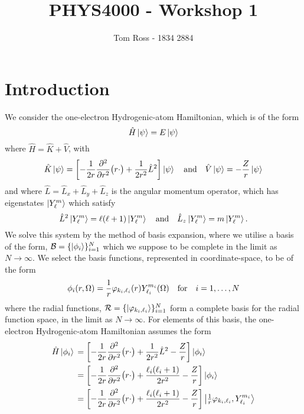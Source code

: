 \documentclass[]{article}
\title{PHYS4000 - Workshop 1}
\author{Tom Ross - 1834 2884}
\date{}
\begin{document}
\section{Introduction}
\label{sec:introduction}

We consider the one-electron Hydrogenic-atom Hamiltonian, which is of the form
\begin{equation*}
  \hat{H}
  \ket{\psi}
  =
  E
  \ket{\psi}
\end{equation*}
where $\hat{H} = \hat{K} + \hat{V}$, with
\begin{equation*}
  \hat{K}
  \ket{\psi}
  =
  \lrsq[\bigg]
  {
    -
    \dfrac{1}{2 r}
    \pdv[2]{r}
    \lr[\big]
    {
      r
      \cdot
    }
    +
    \dfrac{1}{2 r^{2}}
    \hat{L}^{2}
  }
  \ket{\psi}
  \qq{and}
  \hat{V}
  \ket{\psi}
  =
  -
  \dfrac{Z}{r}
  \ket{\psi}
\end{equation*}
and where $\hat{L} = \hat{L}_{x} + \hat{L}_{y} + \hat{L}_{z}$ is the angular
momentum operator, which has eigenstates $\ket{Y_{\ell}^{m}}$ which satisfy
\begin{equation*}
  \hat{L}^{2}
  \ket{Y_{\ell}^{m}}
  =
  \ell
  \lr{\ell + 1}
  \ket{Y_{\ell}^{m}}
  \qq{and}
  \hat{L}_{z}
  \ket{Y_{\ell}^{m}}
  =
  m
  \ket{Y_{\ell}^{m}}
  .
\end{equation*}
We solve this system by the method of basis expansion, where we utilise a basis
of the form, $\mathcal{B} = \lrset{\ket{\phi_{i}}}_{i = 1}^{N}$ which we suppose
to be complete in the limit as $N \to \infty$.
We select the basis functions, represented in coordinate-space, to be of the
form
\begin{equation*}
  \phi_{i}\lr{r, \Omega}
  =
  \dfrac{1}{r}
  \varphi_{k_{i}, \ell_{i}}\lr{r}
  Y_{\ell_{i}}^{m_{i}}\lr{\Omega}
  \qq{for}
  i = 1, \dotsc, N
\end{equation*}
where the radial functions,
$\mathcal{R} = \lrset{\ket{\varphi_{k_{i}, \ell_{i}}}}_{i = 1}^{N}$ form a
complete basis for the radial function space, in the limit as $N \to \infty$.
For elements of this basis, the one-electron Hydrogenic-atom Hamiltonian assumes
the form
\begin{alignat*}{2}
  \hat{H}
  \ket{\phi_{i}}
  {}={}
  &
  \lrsq[\bigg]
  {
    -
    \dfrac{1}{2 r}
    \pdv[2]{r}
    \lr[\big]
    {
      r
      \cdot
    }
    +
    \dfrac{1}{2 r^{2}}
    \hat{L}^{2}
    -
    \dfrac{Z}{r}
  }
  \ket{\phi_{i}}
  \\
  {}={}
  &
  \lrsq[\bigg]
  {
    -
    \dfrac{1}{2 r}
    \pdv[2]{r}
    \lr[\big]
    {
      r
      \cdot
    }
    +
    \dfrac
    {
      \ell_{i}
      \lr{\ell_{i} + 1}
    }
    {
      2
      r^{2}
    }
    -
    \dfrac{Z}{r}
  }
  \ket{\phi_{i}}
  \\
  {}={}
  &
  \lrsq[\bigg]
  {
    -
    \dfrac{1}{2 r}
    \pdv[2]{r}
    \lr[\big]
    {
      r
      \cdot
    }
    +
    \dfrac
    {
      \ell_{i}
      \lr{\ell_{i} + 1}
    }
    {
      2
      r^{2}
    }
    -
    \dfrac{Z}{r}
  }
  \ket
  {
    \tfrac{1}{r}\varphi_{k_{i}, \ell_{i}}
    ,
    Y_{\ell_{i}}^{m_{i}}
  }
\end{alignat*}
\end{document}
